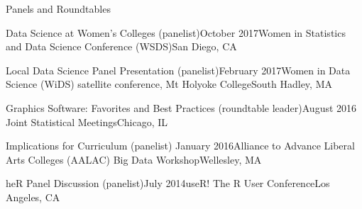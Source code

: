 \documentclass{resume} %
\begin{document}
\begin{rSection}{Panels and Roundtables}



\begin{sSubsection}{Data Science at Women's Colleges}{ (panelist)}{October 2017}{Women in Statistics and Data Science Conference (WSDS)}{San Diego, CA}
\end{sSubsection}

\begin{sSubsection}{Local Data Science Panel Presentation}{ (panelist)}{February 2017}{Women in Data Science (WiDS) satellite conference, Mt Holyoke College}{South Hadley, MA}
\end{sSubsection}

\begin{sSubsection}{Graphics Software: Favorites and Best Practices}{ (roundtable leader)}{August 2016 }{Joint Statistical Meetings}{Chicago, IL}
\end{sSubsection}

\begin{sSubsection}{Implications for Curriculum}{ (panelist) }{January 2016}{Alliance to Advance Liberal Arts Colleges (AALAC) Big Data Workshop}{Wellesley, MA}
\end{sSubsection}

\begin{sSubsection}{heR Panel Discussion}{ (panelist)}{July 2014}{useR! The R User Conference}{Los Angeles, CA}
\end{sSubsection}


\end{rSection}
\end{document}
